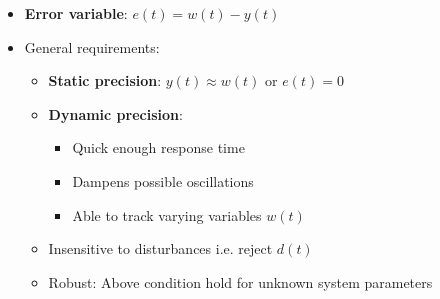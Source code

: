 \documentclass[conference]{IEEEtran}
\begin{document}
\begin{itemize}
    \item \textbf{Error variable}: $e(t) = w(t) - y(t)$
    \item General requirements:
    \begin{itemize}
        \item \textbf{Static precision}: $y(t) \approx w(t)$ or $e(t) = 0$
        \item \textbf{Dynamic precision}: 
        \begin{itemize}
            \item Quick enough response time 
            \item Dampens possible oscillations 
            \item Able to track varying variables $w(t)$
        \end{itemize}
        \item Insensitive to disturbances i.e. reject $d(t)$
        \item Robust: Above condition hold for unknown system parameters
    \end{itemize}
\end{itemize}



\end{document}
